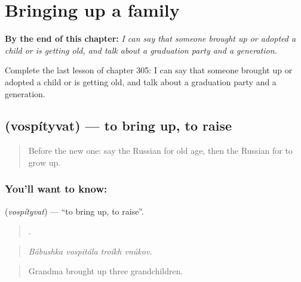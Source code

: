 
\chapter{Bringing up a family}
\label{ch:ru-bringing-up-a-family}

\begin{chapteropening}
\textbf{By the end of this chapter:} \emph{I can say that someone brought up or adopted a child or is getting old, and talk about a graduation party and a generation.}

Complete the last lesson of chapter 305: I can say that someone brought up or adopted a child or is getting old, and talk about a graduation party and a generation.
\end{chapteropening}

\section[\texorpdfstring{\ru{воспитывать} (vospítyvat)}{воспитывать (vospítyvat)}]{ (vospítyvat) — to bring up, to raise}

\label{lesson:RU-C305-vospityvat}



\begin{quote}
Before the new one: say the Russian for old age, then the Russian for to grow up.
\end{quote}

\subsection*{You'll want to know: }
\textbf{} (\emph{vospítyvat}) — \textquotedblleft{}to bring up, to raise\textquotedblright{}.

\begin{quote}
   .
\end{quote}

\begin{quote}
\emph{Bábushka vospitála troíkh vnúkov.}
\end{quote}

\begin{quote}
Grandma brought up three grandchildren.
\end{quote}

